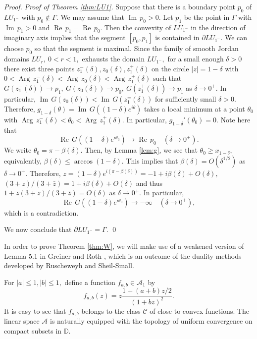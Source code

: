 \documentclass[a4paper,12pt]{amsart}
\numberwithin{equation}{section}
\theoremstyle{definition}
\newenvironment{pf}[1][]{ \vskip 3mm
 \noindent
 \ifthenelse{\equal{#1}{}}  {{\slshape Proof. }}  {{\slshape #1.} } }{\qed\bigskip}
\begin{document}
\begin{pf}[Proof of Theorem \ref{thm:LU1}]
Suppose that there is a boundary point $p_0$ of $LU_{1^-}$ with
$p_0\notin\Gamma.$
We may assume that ${{\operatorname{Im}\,}} p_0>0.$
Let $p_1$ be the point in $\Gamma$ with ${{\operatorname{Im}\,}} p_1>0$ and ${{\operatorname{Re}\,}} p_1={{\operatorname{Re}\,}} p_0.$
Then the convexity of $LU_{1^-}$ in the direction of imaginary axis implies
that the segment $[p_0,p_1]$ is contained in $\partial LU_{1^-}.$
We can choose $p_0$ so that the segment is maximal.
Since the family of smooth Jordan domains $LU_r,~0<r<1,$ exhausts the domain
$LU_{1^-},$ for a small enough $\delta>0$
there exist three points $z_1^-(\delta), z_0(\delta), z_1^+(\delta)$
on the circle $|z|=1-\delta$ with
$0<{{\operatorname{Arg}\,}} z_1^-(\delta)<{{\operatorname{Arg}\,}}  z_0(\delta)<{{\operatorname{Arg}\,}} z_1^+(\delta)$ such that
$G(z_1^-(\delta))\to p_1,~G(z_0(\delta))\to p_0,~G(z_1^+(\delta))\to p_1$ as
$\delta\to0^+.$
In particular, ${{\operatorname{Im}\,}} G(z_0(\delta))<{{\operatorname{Im}\,}} G(z_1^\pm(\delta))$ for sufficiently
small $\delta>0.$
Therefore, $g_{1-\delta}(\theta)={{\operatorname{Im}\,}} G((1-\delta)e^{i\theta})$
takes a local minimum at a point
$\theta_0$ with ${{\operatorname{Arg}\,}} z_1^-(\delta)<\theta_0<{{\operatorname{Arg}\,}} z_1^+(\delta).$
In particular, $g_{1-\delta}'(\theta_0)=0.$
Note here that
$$
{{\operatorname{Re}\,}} G((1-\delta)e^{i\theta_0})\to {{\operatorname{Re}\,}} p_0\quad(\delta\to0^+).
$$
We write $\theta_0=\pi-\beta(\delta).$
Then, by Lemma \ref{lem:g}, we see that $\theta_0\ge x_{1-\delta},$
equivalently, $\beta(\delta)\le \arccos(1-\delta).$
This implies that $\beta(\delta)=O(\delta^{1/2})$ as $\delta\to0^+.$
Therefore, $z=(1-\delta)e^{i(\pi-\beta(\delta))}=-1+i\beta(\delta)+O(\delta),$
$(3+z)/(3+\bar z)=1+i\beta(\delta)+O(\delta)$
and thus $1+z(3+z)/(3+\bar z)=O(\delta)$ as $\delta\to0^+.$
In particular,
$$
{{\operatorname{Re}\,}} G((1-\delta)e^{i\theta_0})\to -\infty\quad(\delta\to0^+),
$$
which is a contradiction.

We now conclude that $\partial LU_{1^-}=\Gamma.$
\end{pf}

In order to prove Theorem \ref{thm:W}, we will make use of a weakened
version of Lemma 5.1 in Greiner and Roth \cite{GR03}, which is an outcome
of the duality methods developed by Ruscheweyh and Sheil-Small.

For $|a|\le1, |b|\le 1,$ define a function $f_{a,b}\in{{\mathcal A}}_1$ by
$$
f_{a,b}(z)=z\frac{1+(a+b)z/2}{(1+bz)^2}.
$$
It is easy to see that $f_{a,b}$ belongs to the class ${{\mathcal C}}$
of close-to-convex functions.
The linear space ${{\mathcal A}}$ is naturally equipped with the topology of
uniform convergence on compact subsets in ${{\mathbb D}}.$
\end{document}
